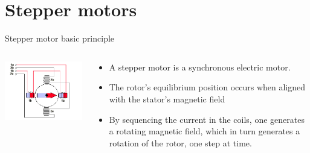 \documentclass[compress]{beamer}
\makeatletter
\let\beamer@writeslidentry@miniframeson=\beamer@writeslidentry
\newcommand*{\miniframeson}{\let\beamer@writeslidentry=\beamer@writeslidentry@miniframeson}
\makeatother
\begin{document}
\miniframeson



\section{Stepper motors}

\begin{frame}{Stepper motor basic principle}
    \begin{columns}
        \begin{column}{0.4\linewidth}
            \begin{center}
                \includegraphics[width=1.2\linewidth]{bipolar}
            \end{center}
        \end{column}
        \begin{column}{0.6\linewidth}
            \begin{itemize}
                \item A stepper motor is a synchronous electric motor.
                \item The rotor's equilibrium position occurs when aligned with the
                    stator's magnetic field
                \item By sequencing the current in the coils, one generates a rotating
                    magnetic field, which in turn generates a rotation of the
                    rotor, one step at time.
            \end{itemize}
        \end{column}
    \end{columns}

\end{frame}
\end{document}
